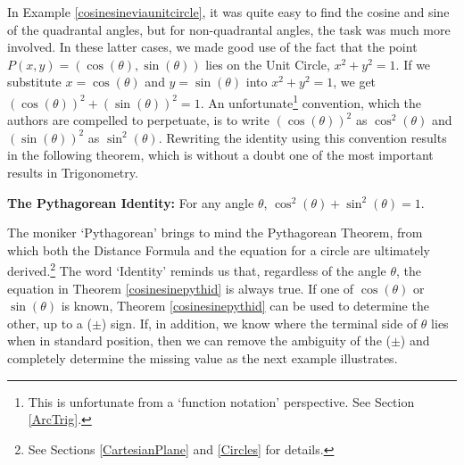 In Example \ref{cosinesineviaunitcircle},  it was quite easy to find the cosine and sine of the quadrantal angles, but for non-quadrantal angles, the task was much more involved.   In these latter cases, we made good use of the fact that the point $P(x,y) = (\cos(\theta), \sin(\theta))$ lies on the Unit Circle, $x^2+y^2 = 1$.  If we substitute  $x=\cos(\theta)$ and $y = \sin(\theta)$ into $x^2+y^2=1$, we get  $\left(\cos(\theta)\right)^2 + \left(\sin(\theta)\right)^2 = 1$.  An unfortunate\footnote{This is unfortunate from a `function notation' perspective. See Section \ref{ArcTrig}.} convention, which the authors are compelled to perpetuate,  is to write $\left(\cos(\theta)\right)^2$ as $\cos^{2}(\theta)$ and $\left(\sin(\theta)\right)^2$ as $\sin^{2}(\theta)$. Rewriting the identity using this convention results in the following theorem, which is without a doubt one of the most important results in Trigonometry.

\smallskip

\colorbox{ResultColor}{\bbm

\begin{thm} \label{cosinesinepythid} \textbf{The Pythagorean Identity:}  For any angle $\theta$, $\cos^{2}(\theta) + \sin^{2}(\theta) = 1$.

\end{thm}

\ebm} 

\smallskip

The moniker `Pythagorean' brings to mind the Pythagorean Theorem, from which both the Distance Formula and the equation for a circle are ultimately derived.\footnote{See Sections \ref{CartesianPlane} and \ref{Circles} for details.}  The word `Identity' reminds us that, regardless of the angle $\theta$, the equation in Theorem \ref{cosinesinepythid} is always true.  If one of $\cos(\theta)$ or $\sin(\theta)$ is known, Theorem \ref{cosinesinepythid} can be used to determine the other, up to a ($\pm$) sign.  If, in addition, we know where the terminal side of $\theta$ lies when in standard position, then we can remove the ambiguity of the ($\pm$) and completely determine the missing value as the next example illustrates.

